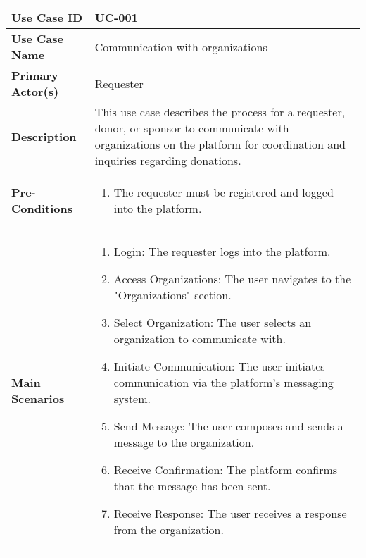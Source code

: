 \begin{table}[!ht]
    \centering
    \renewcommand{\arraystretch}{1.3} %
    \begin{tabularx}{\textwidth}{|l|X|}
        \hline
        \textbf{Use Case ID} & UC-001 \\
        \hline
        \textbf{Use Case Name} & Communication with organizations \\
        \hline
        \textbf{Primary Actor(s)} & Requester \\
        \hline
        \textbf{Description} & This use case describes the process for a requester, donor, or sponsor to communicate with organizations on the platform for coordination and inquiries regarding donations.\\
        \hline
        \textbf{Pre-Conditions} & 
        \begin{enumerate}[label=\arabic*.,itemsep=0pt]
            \item The requester must be registered and logged into the platform.
        \end{enumerate} \\
        \hline
        \textbf{Main Scenarios} & 
        \begin{enumerate}[label=\arabic*.,itemsep=0pt]
            \item Login: The requester logs into the platform.
            \item Access Organizations: The user navigates to the "Organizations" section.
            \item Select Organization: The user selects an organization to communicate with.
            \item Initiate Communication: The user initiates communication via the platform's messaging system.
            \item Send Message: The user composes and sends a message to the organization.
            \item Receive Confirmation: The platform confirms that the message has been sent.
            \item Receive Response: The user receives a response from the organization.
        \end{enumerate} \\
        

\end{tabularx}
\end{table}
